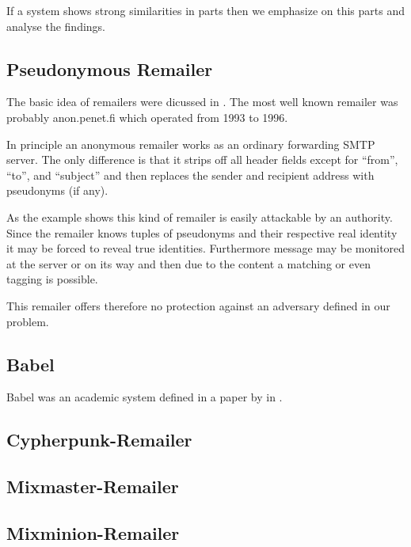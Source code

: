 If a system shows strong similarities in parts then we emphasize on this parts and analyse the findings.

\subsection{Pseudonymous Remailer\label{sec:remPseudo}}
The basic idea of remailers were dicussed in \cite{CHAUM1}. The most well known remailer was probably anon.penet.fi which operated from 1993 to 1996. 

In principle an anonymous remailer works as an ordinary forwarding SMTP server. The only difference is that it strips off all header fields except for ``from'', ``to'', and ``subject'' and then replaces the sender and recipient address with pseudonyms (if any). 

As the example shows this kind of remailer is easily attackable by an authority. Since the remailer knows tuples of pseudonyms and their respective real identity it may be forced to reveal true identities. Furthermore message may be monitored at the server or on its way and then due to the content a matching or even tagging is possible.

This remailer offers therefore no protection against an adversary defined in our problem.

\subsection{Babel}
Babel was an academic system defined in a paper by \citeauthor{babel} in \citeyear{babel}\cite{babel}.


\subsection{Cypherpunk-Remailer\label{sec:remCypherpunk}}

\subsection{Mixmaster-Remailer\label{sec:remMixmaster}}

\subsection{Mixminion-Remailer\label{sec:remMixminion}}

